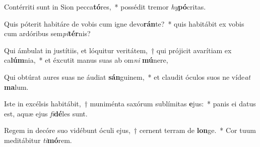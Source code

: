 \item Contérriti sunt in Sion pecca\textbf{tó}res,~* possédit tremor \textit{hy}\textbf{pó}critas.
\item Quis póterit habitáre de vobis cum igne devo\textbf{rán}te?~* quis habitábit ex vobis cum ardóribus sem\textit{pi}\textbf{tér}nis?
\item Qui ámbulat in justítiis, et lóquitur veritátem,~† qui prójicit avarítiam ex ca\textbf{lúm}nia,~* et éxcutit manus suas ab om\textit{ni} \textbf{mú}nere,
\item Qui obtúrat aures suas ne áudiat \textbf{sán}guinem,~* et claudit óculos suos ne víde\textit{at} \textbf{ma}lum.
\item Iste in excélsis habitábit,~† muniménta saxórum sublímitas \textbf{e}jus:~* panis ei datus est, aquæ ejus \textit{fi}\textbf{dé}les sunt.
\item Regem in decóre suo vidébunt óculi ejus,~† cernent terram de \textbf{lon}ge.~* Cor tuum meditábitur \textit{ti}\textbf{mó}rem.
